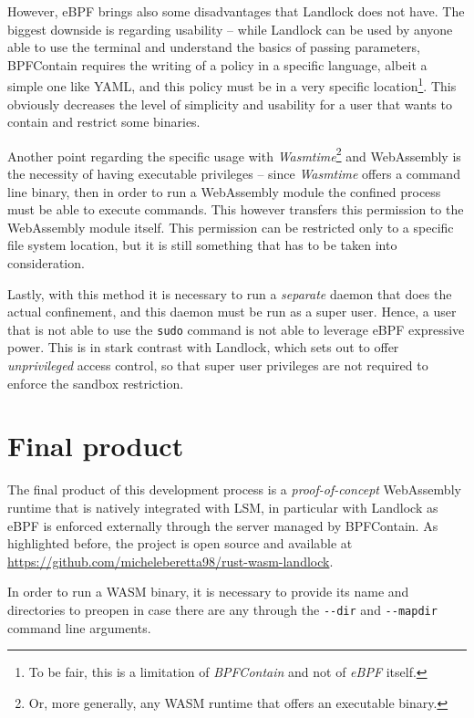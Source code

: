 However, eBPF brings also some disadvantages that Landlock does not have.
The biggest downside is regarding usability -- while Landlock can be used by anyone able to use
the terminal and understand the basics of passing parameters, BPFContain requires the writing
of a policy in a specific language, albeit a simple one like YAML, and this policy must be in a very
specific location\footnote{To be fair, this is a limitation of \textit{BPFContain} and not of \textit{eBPF} itself.}.
This obviously decreases the level of simplicity and usability for a user that wants to contain and restrict
some binaries.

Another point regarding the specific usage with \textit{Wasmtime}\footnote{Or, more generally, any
WASM runtime that offers an executable binary.} and WebAssembly is the necessity of
having executable privileges -- since \textit{Wasmtime} offers a command line binary, then in order to run
a WebAssembly module the confined process must be able to execute commands. This however transfers this
permission to the WebAssembly module itself. This permission can be restricted only to a specific file system
location, but it is still something that has to be taken into consideration.

Lastly, with this method it is necessary to run a \textit{separate} daemon that does the actual
confinement, and this daemon must be run as a super user.
Hence, a user that is not able to use the \texttt{sudo} command is not able to leverage eBPF
expressive power.
This is in stark contrast with Landlock, which sets out to offer \textit{unprivileged} access control,
so that super user privileges are not required to enforce the sandbox restriction.

\section{Final product}

The final product of this development process is a \textit{proof-of-concept} WebAssembly runtime
that is natively integrated with LSM, in particular with Landlock as eBPF is enforced externally
through the server managed by BPFContain.
As highlighted before, the project is open source and available at \url{https://github.com/micheleberetta98/rust-wasm-landlock}.

In order to run a WASM binary, it is necessary to provide its name and directories to preopen in case
there are any through the \texttt{-{}-dir} and \texttt{-{}-mapdir} command line arguments.

